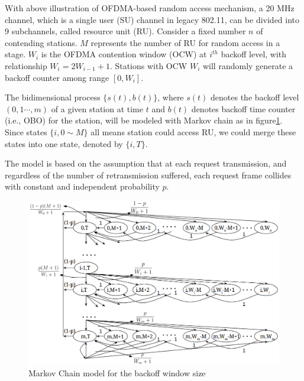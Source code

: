 With above illustration of OFDMA-based random access mechanism, a 20 MHz channel, which is a single user (SU) channel in legacy 802.11, can be divided into 9 subchannels, called resource unit (RU). Consider a fixed number $n$ of contending stations. 
$M$ represents the number of RU for random access in a stage. 
$W_i$ is the OFDMA contention window (OCW) at $i^{th}$ backoff level, with relationship $W_i = 2W_{i-1}+1$. Stations with OCW $W_i$ will randomly generate a backoff counter among range $[0,W_i]$.  

The bidimensional process $\lbrace s(t),b(t) \rbrace$, where $s(t)$ denotes the backoff level $(0,1\cdots ,m)$ of a given station at time $t$ and $b(t)$ denotes backoff time counter (i.e., OBO) for the station, will be modeled with Markov chain as in figure\ref{Markov}. 
Since states $\lbrace i,0\sim M \rbrace$ all means station could access RU, we could merge these states into one state, denoted by $\lbrace i, T \rbrace$. 

The model is based on the assumption that at each request transmission, and regardless of the number of retransmission suffered, each request frame collides with constant and independent probability $p$.

\begin{figure}[!t]
\includegraphics[scale=.45]{./figure/Markov_chain.png}
\caption{Markov Chain model for the backoff window size}
\label{Markov}
\end{figure}

